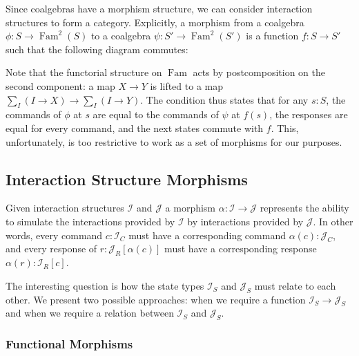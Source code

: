 \documentclass{article}
\theoremstyle{definition}
\newcommand{\mc}[1]{\mathcal{#1}}
\newcommand{\iss}[1]{\mathcal{#1}_S}
\newcommand{\isc}[1]{\mathcal{#1}_C}
\newcommand{\isr}[1]{\mathcal{#1}_R}
\DeclareMathOperator{\Fam}{Fam}
\begin{document}
    Since coalgebras have a morphism
    structure, we can consider interaction structures to form a category.  Explicitly, a morphism from a coalgebra $\phi
    : S \to \Fam^2(S)$ to a coalgebra $\psi : S' \to \Fam^2(S')$ is a function $f : S \to S'$ such that the following
    diagram commutes:

    \begin{center}
    \end{center}

    Note that the functorial structure on $\Fam$ acts by postcomposition on the second component: a map $X \to Y$ is
    lifted to a map $\sum_I (I \to X) \to \sum_I (I \to Y)$.  The condition thus states that for any $s : S$, the
    commands of $\phi$ at $s$ are equal to the commands of $\psi$ at $f(s)$, the responses are equal for every command,
    and the next states commute with $f$.  This, unfortunately, is too restrictive to work as a set of morphisms for our
    purposes.

    \subsection{Interaction Structure Morphisms}

    Given interaction structures $\mc I$ and $\mc J$ a morphism $\alpha : \mc I \to \mc J$ represents the ability to
    simulate the interactions provided by $\mathcal{I}$ by interactions provided by $\mc J$.  In other words, every
    command $c : \isc I$ must have a corresponding command $\alpha(c) : \isc J$, and every response of $r : \isr
    J[\alpha(c)]$ must have a corresponding response $\alpha(r) : \isr I [c]$.

    The interesting question is how the state types $\iss I$ and $\iss J$ must relate to each other.  We present two
    possible approaches: when we require a function $\iss I \to \iss J$ and when we require a relation between $\iss I$
    and $\iss J$.

    \subsubsection{Functional Morphisms}
\end{document}
